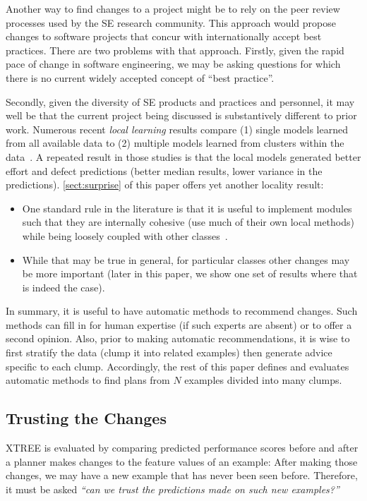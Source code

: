 \documentclass{sig-alternate}
\newcommand{\bi}{\begin{itemize}}
\newcommand{\ei}{\end{itemize}}
\newcommand{\tion}[1]{\textsection\ref{sect:#1}}
\begin{document}
 
Another way  to find   changes to a project
might be to rely
on the peer review processes used by the 
SE research community. This approach would propose changes to software
projects that concur with internationally accept best practices. 
There are two
problems with that approach. Firstly, given the rapid pace of change in software
engineering, we may be asking questions for which there is no current widely
accepted concept of
``best practice''. 

Secondly, given the diversity of SE products and practices
and personnel, it may well be that the current project being discussed is 
substantively different to prior work. 
Numerous recent {\em local learning} results compare (1) single models
learned from all available data to (2) multiple models learned from clusters within the data~\cite{betten14,yang11,yang13,minku13,me12d,me11m,posnett11}.
A repeated result in those studies is that the local models generated better effort
and defect predictions (better median results,
lower variance in the predictions). \tion{surprise} of this  paper offers yet another locality result:
\bi
\item
One standard rule in the literature
is that it is useful to implement modules such that they are internally cohesive (use
much of their own local methods) while being loosely coupled with other classes~\cite{Dhama199565}.
\item
While that may be true in general, for particular classes other changes may be more important
(later in this paper, we show one set of results where that is indeed the case).
\ei
In summary, 
it is useful to have automatic methods to recommend changes. Such
methods can fill in for human expertise (if such experts are absent) or 
to offer a second opinion.
Also, prior to making automatic recommendations, it is wise to first stratify the data
(clump it into related examples) then generate advice specific to each clump.
Accordingly, the rest of this paper defines and evaluates
automatic methods to find plans from
  $N$ examples divided  into  many clumps.





\subsection{Trusting the Changes}\label{sect:trust}
   XTREE is evaluated by  comparing
predicted performance scores before and after a planner makes changes to the feature values of an example:
After making those
changes, we may have a new example that has never been seen before. Therefore, it must be asked
{\em ``can we trust the predictions made on such new examples?''}
 
\end{document}
